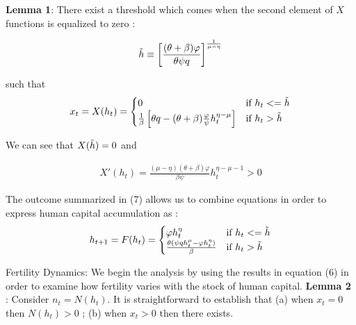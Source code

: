 \textbf{Lemma 1}: There exist a threshold which comes when the second element of $X$ functions is equalized to zero : 

    \begin{equation}
    \begin{aligned}
    \Tilde{h} \equiv \left[\frac{(\theta + \beta)\varphi}{\theta \psi q}\right]^{\frac{1}{\mu - \eta}}
    \end{aligned}
    \end{equation}

such that 
    \begin{equation}
    \begin{aligned}
    x_t = X(h_t)  = \begin{cases}
                    0 & \text{if } h_t <= \Tilde{h} \\
                     \frac{1}{\beta}\left[\theta q - (\theta + \beta) \frac{\varphi}{\psi}  h_t^{\eta - \mu}\right] & \text{if } h_t > \Tilde{h}
                     \end{cases}
    \end{aligned}
    \end{equation}

We can see that $ X(\Tilde{h}) = 0$ and 

    \begin{equation}
    \begin{aligned}
    X'(h_t) = \frac{(\mu - \eta)(\theta + \beta)\varphi}{\beta\psi}h_{t}^{\eta - \mu-1} > 0
    \end{aligned}
    \end{equation}

The outcome summarized in (7) allows us to combine equations in order to express human capital accumulation as : 
    \begin{equation}
    \begin{aligned}
    h_{t+1} = F(h_t)  = \begin{cases}
                    \varphi h_{t}^{\eta}  & \text{if } h_t <= \Tilde{h} \\
                     \frac{\theta (\psi q h_{t}^{\mu} - \varphi h_{t}^{\eta})}{\beta}  & \text{if } h_t > \Tilde{h}
                     \end{cases}
    \end{aligned}
    \end{equation}

Fertility Dynamics:
We begin the analysis by using the results in equation (6) in order to examine how fertility varies with the stock of human capital.
\textbf{Lemma 2} :
Consider $n_t = N(h_t)$. It is straightforward to establish that (a) when $x_t = 0$ then $N(h_t)>0$ ; (b) when $x_t > 0$ then there exists. 
   
